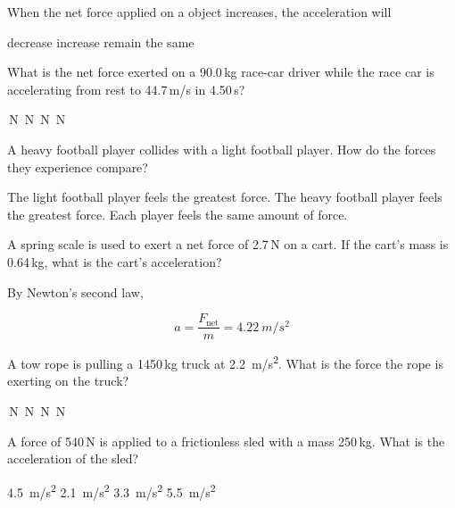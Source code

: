 \documentclass[answers]{exam}
\begin{document}
\begin{questions}

\question
When the net force applied on a object increases, the acceleration will

\begin{randomizechoices}[keeplast]
    \choice decrease
    \correctchoice increase
    \choice remain the same
\end{randomizechoices}

\question
What is the net force exerted on a 90.0\,kg race-car driver while the race car is accelerating from rest to 44.7\,m/s in 4.50\,s?

\begin{randomizechoices}
    \,N
    \,N
    \,N
    \,N
\end{randomizechoices}

\question
A heavy football player collides with a light football player. How do the forces they experience compare?

\begin{randomizechoices}
    \choice The light football player feels the greatest force.
    \choice The heavy football player feels the greatest force.
    \correctchoice Each player feels the same amount of force.
\end{randomizechoices}

\question
A spring scale is used to exert a net force of 2.7\,N on a cart. If the cart's mass is 0.64\,kg, what is the cart's acceleration?

\begin{solution}
By Newton's second law,

\begin{equation*}
    a = \frac{F_\mathrm{net}}{m} = \boxed{\SI{4.22}{m/s^2}}
\end{equation*}
\end{solution}

\question
A tow rope is pulling a 1450\,kg truck at \SI{2.2}{m/s^2}. What is the force the rope is exerting on the truck?

\begin{randomizechoices}
    \,N
    \,N
    \,N
    \,N
\end{randomizechoices}

\question
A force of 540\,N is applied to a frictionless sled with a mass 250\,kg. What is the acceleration of the sled?

\begin{randomizechoices}
    \choice \SI{4.5}{m/s^2}
    \correctchoice \SI{2.1}{m/s^2}
    \choice \SI{3.3}{m/s^2}
    \choice \SI{5.5}{m/s^2}
\end{randomizechoices}



\end{questions}
\end{document}
